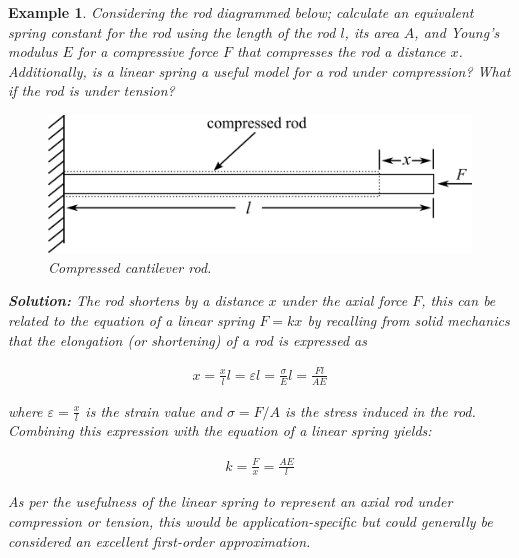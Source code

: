 \documentclass[12pt,letter]{article}
\newtheorem{ex}{Example}
\numberwithin{ex}{section} %
\newenvironment{example}{\begin{mdframed}[middlelinewidth=0.5mm]\begin{ex}\normalfont}{\end{ex}\end{mdframed}}
\numberwithin{re}{section} %
\begin{document}
			\begin{example}
    			
    			Considering the rod diagrammed below; calculate an equivalent spring constant for the rod using the length of the rod $l$, its area $A$, and Young's modulus $E$ for a compressive force $F$ that compresses the rod a distance $x$. Additionally, is a linear spring a useful model for a rod under compression? What if the rod is under tension?
        
		 		\begin{figure}[H]
		 			\centering
		 			\includegraphics[]{../figures/compressed_cantilever_rod.png}
		 			\caption{Compressed cantilever rod. }
		 		\end{figure}	   
       
			    \textbf{Solution:} The rod shortens by a distance $x$ under the axial force $F$, this can be related to the equation of a linear spring $F=kx$ by recalling from solid mechanics that the elongation (or shortening) of a rod is expressed as 
			
			    \begin{eqnarray}
			    x=\frac{x}{l}l=\varepsilon l = \frac{\sigma}{E}l = \frac{Fl}{AE}
			    \end{eqnarray}    
			    
			    where  $\varepsilon = \frac{x}{l}$ is the strain value and $\sigma = F/A$ is the stress induced in the rod. Combining this expression with the equation of a linear spring yields:
			    
			    \begin{eqnarray}
			    k = \frac{F}{x}= \frac{AE}{l}
			    \end{eqnarray}     
			   
			    As per the usefulness of the linear spring to represent an axial rod under compression or tension, this would be application-specific but could generally be considered an excellent first-order approximation.  
			
			\end{example}
\end{document}
